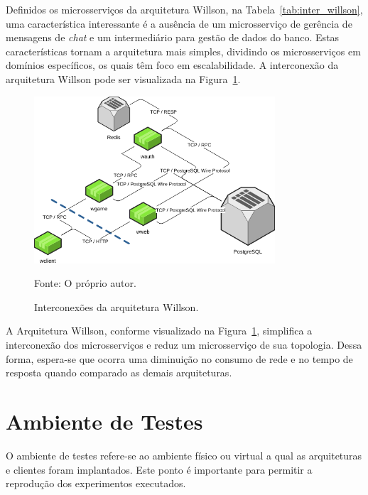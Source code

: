 Definidos os microsserviços da arquitetura Willson, na Tabela~\ref{tab:inter_willson}, uma característica interessante é a ausência de um microsserviço de gerência de mensagens de \textit{chat} e um intermediário para gestão de dados do banco.
%
Estas características tornam a arquitetura mais simples, dividindo os microsserviços em domínios específicos, os quais têm foco em escalabilidade.
%
A interconexão da arquitetura Willson pode ser visualizada na Figura~\ref{fig:interconexao_willson}.



\begin{figure}[htb!]
  \caption{Interconexões da arquitetura Willson.}
  \label{fig:interconexao_willson}
  \includegraphics[width=0.8\textwidth]{figuras/interconexoes/willson.png}
  \centering

  \vspace{-0.3cm}  
  Fonte: O próprio autor.
\end{figure}



A Arquitetura Willson, conforme visualizado na Figura~\ref{fig:interconexao_willson}, simplifica a interconexão dos microsserviços e reduz um microsserviço de sua topologia.
%
Dessa forma, espera-se que ocorra uma diminuição no consumo de rede e no tempo de resposta quando comparado as demais arquiteturas.



\section{Ambiente de Testes}
\label{sec:ambiente_de_testes}



O ambiente de testes refere-se ao ambiente físico ou virtual a qual as arquiteturas e clientes foram implantados.
%
Este ponto é importante para permitir a reprodução dos experimentos executados.



